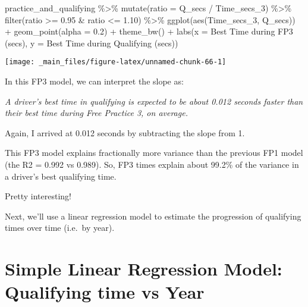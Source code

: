 \documentclass[
]{book}
\newenvironment{Shaded}{\begin{snugshade}}{\end{snugshade}}
\newcommand{\AttributeTok}[1]{\textcolor[rgb]{0.77,0.63,0.00}{#1}}
\newcommand{\FloatTok}[1]{\textcolor[rgb]{0.00,0.00,0.81}{#1}}
\newcommand{\FunctionTok}[1]{\textcolor[rgb]{0.00,0.00,0.00}{#1}}
\newcommand{\NormalTok}[1]{#1}
\newcommand{\SpecialCharTok}[1]{\textcolor[rgb]{0.00,0.00,0.00}{#1}}
\newcommand{\StringTok}[1]{\textcolor[rgb]{0.31,0.60,0.02}{#1}}
\begin{document}
\begin{Shaded}
\begin{Highlighting}[]
\NormalTok{practice\_and\_qualifying }\SpecialCharTok{\%\textgreater{}\%}
  \FunctionTok{mutate}\NormalTok{(}\AttributeTok{ratio =}\NormalTok{ Q\_secs }\SpecialCharTok{/}\NormalTok{ Time\_secs\_3) }\SpecialCharTok{\%\textgreater{}\%} 
  \FunctionTok{filter}\NormalTok{(ratio }\SpecialCharTok{\textgreater{}=} \FloatTok{0.95} \SpecialCharTok{\&}\NormalTok{ ratio }\SpecialCharTok{\textless{}=} \FloatTok{1.10}\NormalTok{) }\SpecialCharTok{\%\textgreater{}\%} 
  \FunctionTok{ggplot}\NormalTok{(}\FunctionTok{aes}\NormalTok{(Time\_secs\_3, Q\_secs)) }\SpecialCharTok{+}
  \FunctionTok{geom\_point}\NormalTok{(}\AttributeTok{alpha =} \FloatTok{0.2}\NormalTok{) }\SpecialCharTok{+}
  \FunctionTok{theme\_bw}\NormalTok{() }\SpecialCharTok{+}
  \FunctionTok{labs}\NormalTok{(}\AttributeTok{x =} \StringTok{\textquotesingle{}Best Time during FP3 (secs)\textquotesingle{}}\NormalTok{,}
       \AttributeTok{y =} \StringTok{\textquotesingle{}Best Time during Qualifying (secs)\textquotesingle{}}\NormalTok{)}
\end{Highlighting}
\end{Shaded}

\begin{center}\texttt{[image: \_main\_files/figure-latex/unnamed-chunk-66-1]} \end{center}

In this FP3 model, we can interpret the slope as:

\emph{A driver's best time in qualifying is expected to be about 0.012 seconds faster than their best time during Free Practice 3, on average.}

Again, I arrived at 0.012 seconds by subtracting the slope from 1.

This FP3 model explains fractionally more variance than the previous FP1 model (the R2 = 0.992 vs 0.989). So, FP3 times explain about 99.2\% of the variance in a driver's best qualifying time.

Pretty interesting!

Next, we'll use a linear regression model to estimate the progression of qualifying times over time (i.e.~by year).

\hypertarget{simple-linear-regression-model-qualifying-time-vs-year}{%
\section{Simple Linear Regression Model: Qualifying time vs Year}\label{simple-linear-regression-model-qualifying-time-vs-year}}
\end{document}
